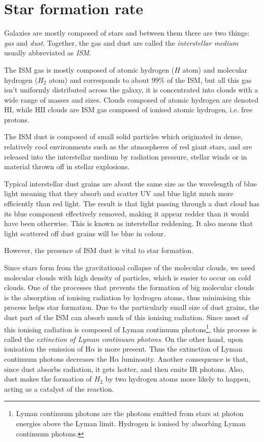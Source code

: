 \documentclass{_mypackages/monograph}
\begin{document}
\chapter{Star formation rate}

Galaxies are mostly composed of stars and between them there are two things: \emph{gas} and \emph{dust}. Together, the gas and dust are called the \emph{interstellar medium} usually abbreviated as \emph{ISM}.

The ISM gas is mostly composed of atomic hydrogen (\(H\) atom) and molecular hydrogen (\(H_2\) atom) and corresponds to about 99\% of the ISM, but all this gas isn't uniformly distributed across the galaxy, it is concentrated into clouds with a wide range of masses and sizes. Clouds composed of atomic hydrogen are denoted HI, while HII clouds are ISM gas composed of ionised atomic hydrogen, i.e. free protons.

The ISM dust is composed of small solid particles which originated in dense, relatively cool environments such as the atmospheres of red giant stars, and are released into the interstellar medium by radiation pressure, stellar winds or in material thrown off in stellar explosions.

Typical interstellar dust grains are about the same size as the wavelength of blue light meaning that they absorb and scatter UV and blue light much more efficiently than red light. The result is that light passing through a dust cloud has its blue component effectively removed, making it appear redder than it would have been otherwise. This is known as interstellar reddening. It also means that light scattered off dust grains will be blue in colour.

However, the presence of ISM dust is vital to star formation.

Since stars form from the gravitational collapse of the molecular clouds, we need molecular clouds with high density of particles, which is easier to occur on cold clouds. One of the processes that prevents the formation of big molecular clouds is the absorption of ionising radiation by hydrogen atoms, thus minimising this process helps star formation. Due to the particularly small size of dust grains, the dust part of the ISM can absorb much of this ionising radiation. Since most of this ionising radiation is composed of Lyman continuum photons\footnote{Lyman continuum photons are the photons emitted from stars at photon energies above the Lyman limit. Hydrogen is ionised by absorbing Lyman continuum photons.}, this process is called the \emph{extinction of Lyman continuum photons}. On the other hand, upon ionisation the emission of H\(\alpha\) is more present. Thus the extinction of Lyman continuum photons decreases the H\(\alpha\) luminosity. Another consequence is that, since dust absorbs radiation, it gets hotter, and then emits IR photons. Also, dust makes the formation of \(H_2\) by two hydrogen atoms more likely to happen, acting as a catalyst of the reaction.
\end{document}
